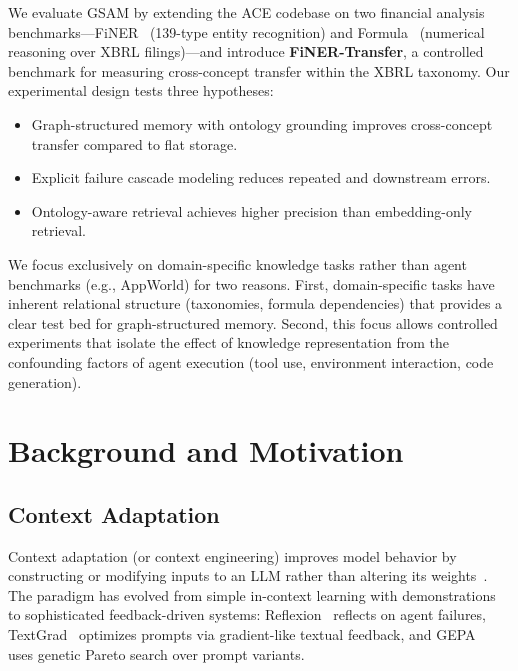 \documentclass[12pt,a4paper]{article}
\begin{document}
We evaluate GSAM by extending the ACE codebase on two financial analysis benchmarks---FiNER~\cite{loukas2022finer} (139-type entity recognition) and Formula~\cite{wang2025finlora} (numerical reasoning over XBRL filings)---and introduce \textbf{FiNER-Transfer}, a controlled benchmark for measuring cross-concept transfer within the XBRL taxonomy. Our experimental design tests three hypotheses:

\begin{itemize}[leftmargin=*]
\item[\textbf{H1}] Graph-structured memory with ontology grounding improves cross-concept transfer compared to flat storage.
\item[\textbf{H2}] Explicit failure cascade modeling reduces repeated and downstream errors.
\item[\textbf{H3}] Ontology-aware retrieval achieves higher precision than embedding-only retrieval.
\end{itemize}

We focus exclusively on domain-specific knowledge tasks rather than agent benchmarks (e.g., AppWorld) for two reasons. First, domain-specific tasks have inherent relational structure (taxonomies, formula dependencies) that provides a clear test bed for graph-structured memory. Second, this focus allows controlled experiments that isolate the effect of knowledge representation from the confounding factors of agent execution (tool use, environment interaction, code generation).

\section{Background and Motivation}
\label{sec:background}

\subsection{Context Adaptation}

Context adaptation (or context engineering) improves model behavior by constructing or modifying inputs to an LLM rather than altering its weights~\cite{ace2025}. The paradigm has evolved from simple in-context learning with demonstrations~\cite{brown2020language,agarwal2024manyshot} to sophisticated feedback-driven systems: Reflexion~\cite{shinn2023reflexion} reflects on agent failures, TextGrad~\cite{yuksekgonul2024textgrad} optimizes prompts via gradient-like textual feedback, and GEPA~\cite{agrawal2025gepa} uses genetic Pareto search over prompt variants.
\end{document}
